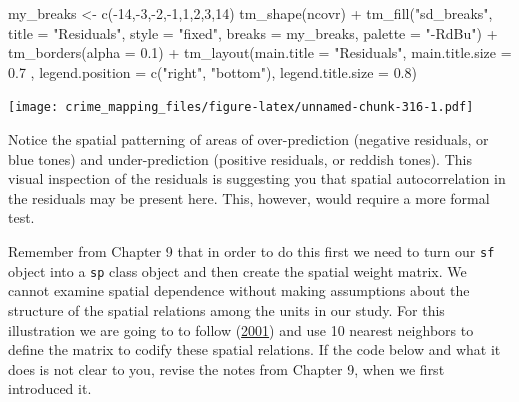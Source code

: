 \documentclass[
  krantz2]{krantz}
\makeatletter
\newenvironment{Shaded}{\begin{snugshade}}{\end{snugshade}}
\newcommand{\AttributeTok}[1]{\textcolor[rgb]{0.61,0.61,0.61}{#1}}
\newcommand{\DecValTok}[1]{\textcolor[rgb]{0.06,0.06,0.06}{#1}}
\newcommand{\FloatTok}[1]{\textcolor[rgb]{0.06,0.06,0.06}{#1}}
\newcommand{\FunctionTok}[1]{\textcolor[rgb]{0,0,0}{#1}}
\newcommand{\NormalTok}[1]{#1}
\newcommand{\OtherTok}[1]{\textcolor[rgb]{0.37,0.37,0.37}{#1}}
\newcommand{\SpecialCharTok}[1]{\textcolor[rgb]{0,0,0}{#1}}
\newcommand{\StringTok}[1]{\textcolor[rgb]{0.5,0.5,0.5}{#1}}
\newenvironment{kframe}{%
\medskip{}
\setlength{\fboxsep}{.8em}
 \def\at@end@of@kframe{}%
 \ifinner\ifhmode%
  \def\at@end@of@kframe{\end{minipage}}%
  \begin{minipage}{\columnwidth}%
 \fi\fi%
 \def\FrameCommand##1{\hskip\@totalleftmargin \hskip-\fboxsep
 \colorbox{shadecolor}{##1}\hskip-\fboxsep
     \hskip-\linewidth \hskip-\@totalleftmargin \hskip\columnwidth}%
 \MakeFramed {\advance\hsize-\width
   \@totalleftmargin\z@ \linewidth\hsize
   \@setminipage}}%
 {\par\unskip\endMakeFramed%
 \at@end@of@kframe}
\renewenvironment{Shaded}{\begin{kframe}}{\end{kframe}}
\makeatother
\begin{document}
\begin{Shaded}
\begin{Highlighting}[]
\NormalTok{my\_breaks }\OtherTok{\textless{}{-}} \FunctionTok{c}\NormalTok{(}\SpecialCharTok{{-}}\DecValTok{14}\NormalTok{,}\SpecialCharTok{{-}}\DecValTok{3}\NormalTok{,}\SpecialCharTok{{-}}\DecValTok{2}\NormalTok{,}\SpecialCharTok{{-}}\DecValTok{1}\NormalTok{,}\DecValTok{1}\NormalTok{,}\DecValTok{2}\NormalTok{,}\DecValTok{3}\NormalTok{,}\DecValTok{14}\NormalTok{)}
\FunctionTok{tm\_shape}\NormalTok{(ncovr) }\SpecialCharTok{+} 
  \FunctionTok{tm\_fill}\NormalTok{(}\StringTok{"sd\_breaks"}\NormalTok{, }\AttributeTok{title =} \StringTok{"Residuals"}\NormalTok{, }\AttributeTok{style =} \StringTok{"fixed"}\NormalTok{, }
          \AttributeTok{breaks =}\NormalTok{ my\_breaks, }\AttributeTok{palette =} \StringTok{"{-}RdBu"}\NormalTok{) }\SpecialCharTok{+}
  \FunctionTok{tm\_borders}\NormalTok{(}\AttributeTok{alpha =} \FloatTok{0.1}\NormalTok{) }\SpecialCharTok{+}
  \FunctionTok{tm\_layout}\NormalTok{(}\AttributeTok{main.title =} \StringTok{"Residuals"}\NormalTok{, }\AttributeTok{main.title.size =} \FloatTok{0.7}\NormalTok{ ,}
            \AttributeTok{legend.position =} \FunctionTok{c}\NormalTok{(}\StringTok{"right"}\NormalTok{, }\StringTok{"bottom"}\NormalTok{), }\AttributeTok{legend.title.size =} \FloatTok{0.8}\NormalTok{)}
\end{Highlighting}
\end{Shaded}

\texttt{[image: crime\_mapping\_files/figure-latex/unnamed-chunk-316-1.pdf]}

Notice the spatial patterning of areas of over-prediction (negative residuals, or blue tones) and under-prediction (positive residuals, or reddish tones). This visual inspection of the residuals is suggesting you that spatial autocorrelation in the residuals may be present here. This, however, would require a more formal test.

Remember from Chapter 9 that in order to do this first we need to turn our \texttt{sf} object into a \texttt{sp} class object and then create the spatial weight matrix. We cannot examine spatial dependence without making assumptions about the structure of the spatial relations among the units in our study. For this illustration we are going to to follow (\protect\hyperlink{ref-Baller_2001}{2001}) and use 10 nearest neighbors to define the matrix to codify these spatial relations. If the code below and what it does is not clear to you, revise the notes from Chapter 9, when we first introduced it.
\end{document}
